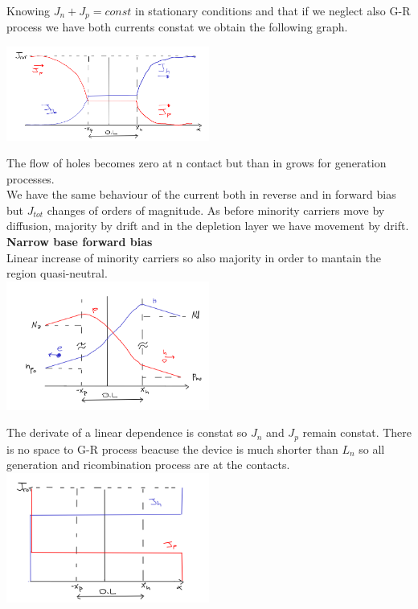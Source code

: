 Knowing $J_n+J_p=const$ in stationary conditions and that if we neglect also G-R process we have both currents constat we obtain the following graph.

\centering
\includegraphics[width=0.5\textwidth]{wbrb.png}\\
\raggedright

The flow of holes becomes zero at n contact but than in grows for generation processes.\\
We have the same behaviour of the current both in reverse and in forward bias but $J_{tot}$ changes of orders of magnitude. As before minority carriers move by diffusion, majority by drift and in the depletion layer we have movement by drift.\\

{\bf Narrow base forward bias}\\
Linear increase of minority carriers so also majority in order to mantain the region quasi-neutral.\\

\centering
\includegraphics[width=0.5\textwidth]{nbfb.png}\\
\raggedright

The derivate of a linear dependence is constat so $J_n$ and $J_p$ remain constat. There is no space to G-R process beacuse the device is much shorter than $L_n$ so all generation and ricombination process are at the contacts.\\


\centering
\includegraphics[width=0.5\textwidth]{nbJf.png}\\
\raggedright


